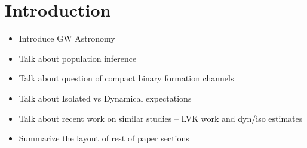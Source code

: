 \section{Introduction} \label{sec:intro}

\begin{itemize}
    \item Introduce GW Astronomy
    \item Talk about population inference
    \item Talk about question of compact binary formation channels
    \item Talk about Isolated vs Dynamical expectations
    \item Talk about recent work on similar studies -- LVK work and dyn/iso estimates
    \item Summarize the layout of rest of paper sections
\end{itemize}